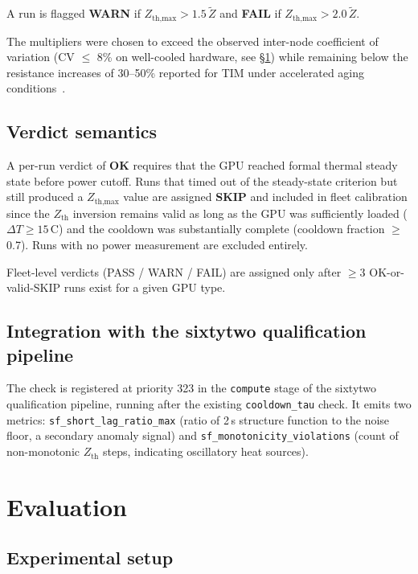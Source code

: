 \documentclass[conference]{IEEEtran}
\begin{document}
A run is flagged \textbf{WARN} if $Z_\text{th,max} > 1.5\,\tilde{Z}$
and \textbf{FAIL} if $Z_\text{th,max} > 2.0\,\tilde{Z}$.

The multipliers were chosen to exceed the observed inter-node
coefficient of variation (CV $\leq$ 8\% on well-cooled hardware,
see \S\ref{sec:eval}) while remaining below the resistance increases
of 30--50\% reported for TIM under accelerated aging
conditions~\cite{skuriat2013,carlton2020}.

\subsection{Verdict semantics}

A per-run verdict of \textbf{OK} requires that the GPU reached formal
thermal steady state before power cutoff.
Runs that timed out of the steady-state criterion but still produced
a $Z_\text{th,max}$ value are assigned \textbf{SKIP} and included
in fleet calibration since the $Z_\text{th}$ inversion
remains valid as long as the GPU was sufficiently loaded ($\Delta T
\geq 15$\,\textdegree C) and the cooldown was substantially
complete (cooldown fraction $\geq$ 0.7).
Runs with no power measurement are excluded entirely.

Fleet-level verdicts (PASS / WARN / FAIL) are assigned only after
$\geq$3 OK-or-valid-SKIP runs exist for a given GPU type.

\subsection{Integration with the sixtytwo qualification pipeline}

The check is registered at priority 323 in the \texttt{compute}
stage of the sixtytwo qualification pipeline, running after the
existing \texttt{cooldown\_tau} check.
It emits two metrics: \texttt{sf\_short\_lag\_ratio\_max} (ratio of
2\,s structure function to the noise floor, a secondary anomaly
signal) and \texttt{sf\_monotonicity\_violations} (count of
non-monotonic $Z_\text{th}$ steps, indicating oscillatory heat
sources).

\section{Evaluation}
\label{sec:eval}

\subsection{Experimental setup}
\end{document}
